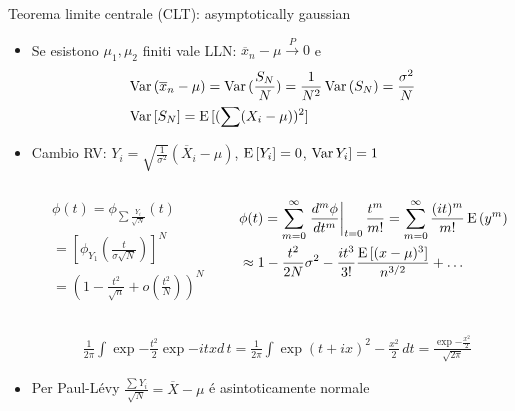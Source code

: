 \documentclass[asd-beamer.tex]{subfiles}%
\begin{document}
\begin{frame}{Teorema limite centrale (CLT): asymptotically gaussian}
\begin{itemize}
\item Se esistono $\mu_1, \mu_2$ finiti vale LLN: $\overline{x}_n-\mu\xrightarrow{P}0$ e
\begin{align*}
&\operatorname{Var}{(\overline{x}_n-\mu)}=\operatorname{Var}{(\frac{S_N}{N})}=\frac{1}{N^2}\operatorname{Var}{(S_N)}=\frac{\sigma^2}{N}\\
&\operatorname{Var}{[S_N]}=\operatorname{E}{[(\sum(X_i-\mu))^2]}
\end{align*}
\item Cambio RV: $Y_i=\sqrt{\frac{1}{\sigma^2}}(\overline{X}_i-\mu)$, $\operatorname{E}{[Y_i]}=0$, $\operatorname{Var}{Y_i]}=1$
\begin{columns}[T]
\begin{column}{0.4\textwidth}
\begin{align*}
&\phi(t)=\phi_{\sum\frac{Y_i}{\sqrt{N}}}(t)\\
&=[\phi_{Y_1}(\frac{t}{\sigma\sqrt{N}})]^N\\
&=(1-\frac{t^2}{\sqrt{n}}+o(\frac{t^2}{N}))^N
\end{align*}
	\end{column}
	\begin{column}{0.7\textwidth}
\begin{align*}
&\phi(t)=\sum_{m=0}^{\infty}\left.\frac{d^m\phi}{dt^m}\right|_{t=0}\frac{t^m}{m!}=\sum_{m=0}^{\infty}\frac{(it)^m}{m!}\operatorname{E}{(y^m)}\\
&\approx1-\frac{t^2}{2N}\sigma^2-\frac{it^3}{3!}\frac{\operatorname{E}{[(x-\mu)^3]}}{n^{3/2}}+\ldots
\end{align*}
	\end{column}
\end{columns}
\begin{align*}
&\frac{1}{2\pi}\int\exp{-\frac{t^2}{2}}\exp{-itx}d\,t=\frac{1}{2\pi}\int\exp{(t+ix)^2-\frac{x^2}{2}}\,dt=\frac{\exp{-\frac{x^2}{2}}}{\sqrt{2\pi}}
\end{align*}
\item Per Paul-L\'evy $\frac{\sum Y_i}{\sqrt{N}}=\overline{X}-\mu$ \'e asintoticamente normale
\end{itemize}
\end{frame}
\end{document}
